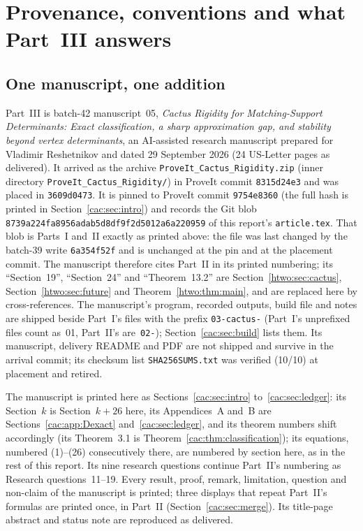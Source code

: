\documentclass[11pt]{article}
\numberwithin{equation}{section}
\theoremstyle{definition}
\begin{document}
\section{Provenance, conventions and what Part~III answers}
\label{cac:sec:prov}

\subsection{One manuscript, one addition}
\label{cac:sec:source}
Part~III is batch-42 manuscript~05, \emph{Cactus Rigidity for
Matching-Support Determinants: Exact classification, a sharp approximation
gap, and stability beyond vertex determinants}, an AI-assisted research
manuscript prepared for Vladimir Reshetnikov and dated 29 September 2026
(24 US-Letter pages as delivered). It arrived as the archive
\nolinkurl{ProveIt_Cactus_Rigidity.zip} (inner directory
\nolinkurl{ProveIt_Cactus_Rigidity/}) in ProveIt commit \texttt{8315d24e3}
and was placed in \texttt{3609d0473}. It is pinned to ProveIt commit
\texttt{9754e8360} (the full hash is printed in
Section~\ref{cac:sec:intro}) and records the Git blob
\texttt{8739a224fa8956adab5d\allowbreak 8df9f2d5012a6a220959} of this
report's \texttt{article.tex}. That blob is Parts~I and~II exactly as printed
above: the file was last changed by the batch-39 write \texttt{6a354f52f}
and is unchanged at the pin and at the placement commit. The manuscript
therefore cites Part~II in its printed numbering; its ``Section~19'',
``Section~24'' and ``Theorem~13.2'' are Section~\ref{htwo:sec:cactus},
Section~\ref{htwo:sec:future} and Theorem~\ref{htwo:thm:main}, and are
replaced here by cross-references. The manuscript's program, recorded
outputs, build file and notes are shipped beside Part~I's files with the
prefix \texttt{03-cactus-} (Part~I's unprefixed files count as~01, Part~II's
are~\texttt{02-}); Section~\ref{cac:sec:build} lists them. Its manuscript,
delivery README and PDF are not shipped and survive in the arrival commit;
its checksum list \texttt{SHA256SUMS.txt} was verified (10/10) at placement
and retired.

The manuscript is printed here as Sections~\ref{cac:sec:intro}
to~\ref{cac:sec:ledger}: its Section~$k$ is Section~$k+26$ here, its
Appendices~A and~B are Sections~\ref{cac:app:Dexact}
and~\ref{cac:sec:ledger}, and its theorem numbers shift accordingly (its
Theorem~3.1 is Theorem~\ref{cac:thm:classification}); its equations,
numbered (1)--(26) consecutively there, are numbered by section here, as in
the rest of this report. Its
nine research questions continue Part~II's numbering as Research
questions~11--19. Every result, proof, remark, limitation, question and
non-claim of the manuscript is printed; three displays that repeat Part~II's
formulas are printed once, in Part~II (Section~\ref{cac:sec:merge}). Its
title-page abstract and status note are reproduced as delivered.
\end{document}
